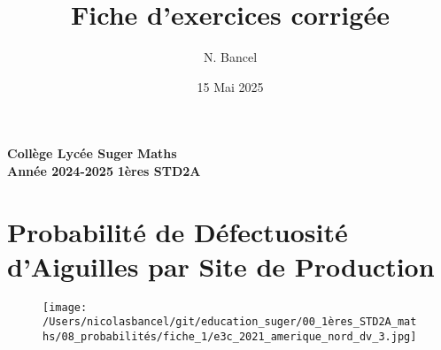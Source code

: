 \documentclass{exam}
\title{Fiche d'exercices corrigée}
\author{N. Bancel}
\date{15 Mai 2025}
\begin{document}
\textbf{Collège Lycée Suger}
\hfill
\textbf{Maths} \\

\textbf{Année 2024-2025}
\hfill
\textbf{1ères STD2A} \par

{\let\newpage\relax\maketitle}




\section*{Probabilité de Défectuosité d'Aiguilles par Site de Production}

    \begin{figure}[H]
      \centering
      \texttt{[image: /Users/nicolasbancel/git/education\_suger/00\_1ères\_STD2A\_maths/08\_probabilités/fiche\_1/e3c\_2021\_amerique\_nord\_dv\_3.jpg]}
      \captionsetup{labelformat=empty}
    \end{figure}
\end{document}
